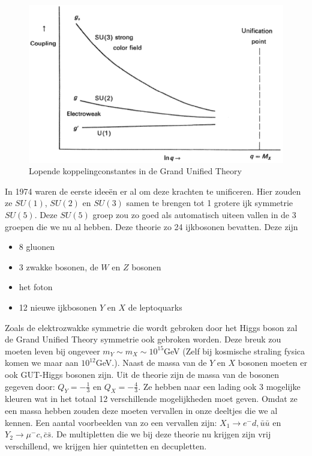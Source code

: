 \documentclass[../main.tex]{subfiles}
\begin{document}
\begin{figure}[h]
    \centering
    \includegraphics[width=0.5\linewidth]{physics_beyond_the_standard_model/grand_unified_theory.png}
    \caption{Lopende koppelingconstantes in de Grand Unified Theory}%
    \label{fig:physics_beyond_the_standard_model/grand_unified_theory}
\end{figure}

In 1974 waren de eerste ideeën er al om deze krachten te unificeren. Hier zouden ze $SU(1)$, $SU(2)$ en $SU(3)$ samen te brengen tot 1 grotere ijk symmetrie $SU(5)$. Deze $SU(5)$ groep zou zo goed als automatisch uiteen vallen in de 3 groepen die we nu al hebben. Deze theorie zo 24 ijkbosonen bevatten. Deze zijn
\begin{itemize}
    \item 8 gluonen
    \item 3 zwakke bosonen, de $W$ en $Z$ bosonen
    \item het foton
    \item 12 nieuwe ijkbosonen $Y$ en $X$ de leptoquarks
\end{itemize}
Zoals de elektrozwakke symmetrie die wordt gebroken door het Higgs boson zal de Grand Unified Theory symmetrie ook gebroken worden. Deze breuk zou moeten leven bij ongeveer $m_{Y} \sim m_{X} \sim 10^{15}$GeV (Zelf bij kosmische straling fysica komen we maar aan $10^{12}$GeV.). Naast de massa van de $Y$ en $X$ bosonen moeten er ook GUT-Higgs bosonen zijn. Uit de theorie zijn de massa van de bosonen gegeven door: $Q_{Y}=-\frac{1}{3}$ en $Q_{X}=-\frac{4}{3}$. Ze hebben naar een lading ook 3 mogelijke kleuren wat in het totaal 12 verschillende mogelijkheden moet geven. Omdat ze een massa hebben zouden deze moeten vervallen in onze deeltjes die we al kennen. Een aantal voorbeelden van zo een vervallen zijn: $X_{1} \rightarrow e^{-} d, \bar{u} \bar{u}$ en $Y_{2} \rightarrow \mu^{-} c, \bar{c} \bar{s}$. De multipletten die we bij deze theorie nu krijgen zijn vrij verschillend, we krijgen hier quintetten en decupletten.
\end{document}

